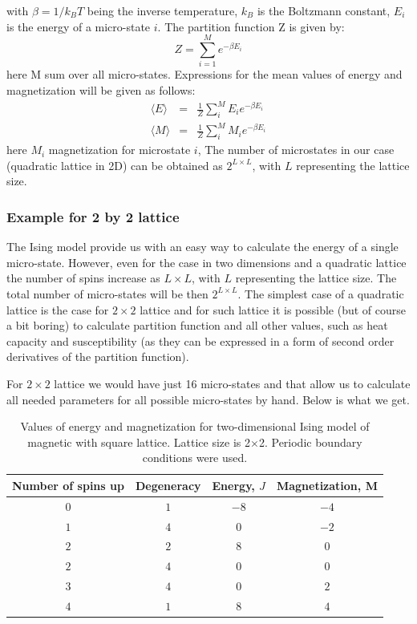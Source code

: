 \documentclass[a4paper]{article}
\begin{document}
with $\beta = 1/k_{B}T$ being the inverse temperature, $k_{B}$ is the Boltzmann constant, $E_{i}$ is the energy of a micro-state $i$. The partition function Z is given by:
\begin{equation}
Z=\sum_{i=1}^{M}e^{-\beta E_{i}}
\end{equation}
here M sum over all micro-states. 
Expressions for the mean values of energy and magnetization will be given as follows:
\begin{eqnarray}
\langle E\rangle &=&\frac{1}{Z}\sum_{i}^{M}E_{i}e^{-\beta E_{i}} \\
\langle M\rangle &=&\frac{1}{Z}\sum_{i}^{M}M_{i}e^{-\beta E_{i}}
\end{eqnarray}
here $M_{i}$ magnetization for microstate $i$, 
The number of microstates in our case (quadratic lattice in 2D) can be obtained
as $2^{L\times L}$, with $L$ representing the lattice size.

\subsubsection{Example for 2 by 2 lattice}
The Ising model provide us with an easy way to calculate the energy of a single micro-state. However, even for the case in two dimensions and a quadratic lattice the number of spins increase as ${L\times L}$, with $L$ representing the lattice size. The total number of micro-states will be then $2^{L\times L}$. The simplest case of a quadratic lattice is the case for $2\times 2$ lattice and for such lattice it is possible (but of course a bit boring) to calculate partition function and all other values, such as heat capacity and susceptibility (as they can be expressed in a form of second order derivatives of the partition function). 


For $2\times 2$ lattice we would have just 16 micro-states and that allow us to calculate all needed parameters for all possible micro-states by hand. Below is what we get.

\begin{table}[h!]
  \caption{Values of energy and magnetization for two-dimensional Ising model of magnetic with square lattice. Lattice size is 2$\times$2. Periodic boundary conditions were used.}
  \label{tab:2x2}
  \begin{center}
    \begin{tabular}{c|c|c|c}
    \hline
		Number of spins up & Degeneracy & Energy, $J$ & Magnetization, M \\
        \hline
	$	0 $  & $ 1 $ & $ -8 $ & $ -4 $  \\
	$	1 $  & $ 4 $ & $  0 $ & $ -2 $  \\
	$	2 $  & $ 2 $ & $  8 $ & $ 0  $  \\
	$	2 $  & $ 4 $ & $  0 $ & $ 0  $  \\
	$	3 $  & $ 4 $ & $  0 $ & $ 2  $  \\
  $	4 $  & $ 1 $ & $  8 $ & $ 4  $  \\

	\end{tabular}
  \end{center}
\end{table}
\end{document}
